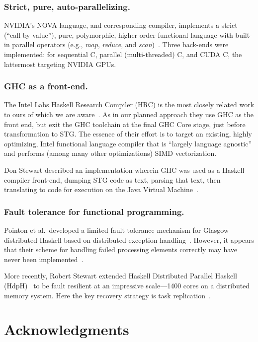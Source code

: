 \documentclass{llncs}
\begin{document}
\subsubsection{Strict, pure, auto-parallelizing.}
NVIDIA's NOVA language, and corresponding compiler, implements a strict
(``call by value''), pure, polymorphic, higher-order functional language with
built-in parallel operators (e.g., \emph{map}, \emph{reduce}, and
\emph{scan})~\cite{NVIDIA:2013}. Three back-ends were implemented: for
sequential C, parallel (multi-threaded) C, and CUDA C, the lattermost
targeting NVIDIA GPUs.

\subsubsection{GHC as a front-end.}
The Intel Labs Haskell Research Compiler (HRC) is the most closely related
work to ours of which we are aware~\cite{Liu:2013,Petersen:2013}.  As in our
planned approach they use GHC as the front end, but exit the GHC toolchain
at the final GHC Core stage, just before transformation to STG.  The essence
of their effort is to target an existing, highly optimizing, Intel functional
language compiler that is ``largely language agnostic'' and performs (among
many other optimizations) SIMD vectorization.

Don Stewart described an implementation wherein GHC was used as a Haskell compiler
front-end, dumping STG code as text, parsing that text, then translating to
code for execution on the Java Virtual Machine~\cite{Stewart-BSc}.

\subsubsection{Fault tolerance for functional programming.}
Pointon et al.\ developed a limited fault tolerance mechanism for Glasgow
distributed Haskell based on distributed exception
handling~\cite{Pointon:2001}.  However, it appears that their scheme for
handling failed processing elements correctly may have
never been implemented~\cite{Trinder:2000}.

More recently, Robert Stewart extended Haskell Distributed Parallel Haskell
(HdpH)~\cite{hdph} to be fault resilient at an impressive scale---1400 cores
on a distributed memory system.  Here the key recovery strategy is task
replication~\cite{Stewart:2013}.

\section{Acknowledgments}
\end{document}
